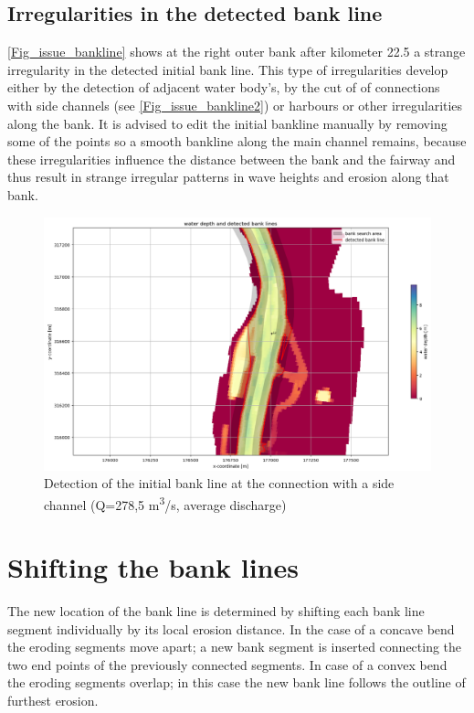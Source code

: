 \subsection{Irregularities in the detected bank line}
\autoref{Fig_issue_bankline} shows at the right outer bank after kilometer 22.5 a strange irregularity in the detected initial bank line. This type of irregularities develop either by the detection of adjacent water body's, by the cut of of connections with side channels (see \autoref{Fig_issue_bankline2}) or harbours or other irregularities along the bank. It is advised to edit the initial bankline manually by removing some of the points so a smooth bankline along the main channel remains, because these irregularities influence the distance between the bank and the fairway and thus result in strange irregular patterns in wave heights and erosion along that bank.

\begin{figure}[!h]
	\includegraphics[width=\textwidth]{figures/detection_issue2.png}
	\caption{Detection of the initial bank line at the connection with a side channel (Q=278,5 m\textsuperscript{3}/s, average discharge)}
	\label{Fig_issue_bankline2}
\end{figure}

\section{Shifting the bank lines} \label{Sec:BankShift}

The new location of the bank line is determined by shifting each bank line segment individually by its local erosion distance.
In the case of a concave bend the eroding segments move apart; a new bank segment is inserted connecting the two end points of the previously connected segments.
In case of a convex bend the eroding segments overlap; in this case the new bank line follows the outline of furthest erosion.

